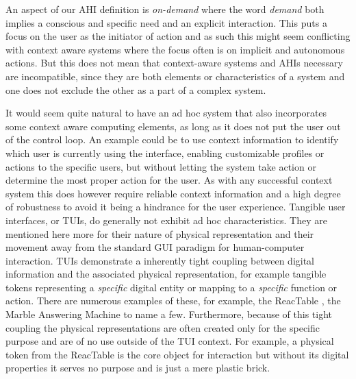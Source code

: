 An aspect of our AHI definition is \emph{on-demand} where the word \emph{demand} both implies a conscious and specific need and an explicit interaction.
This puts a focus on the user as the initiator of action and as such this might seem conflicting with context aware systems where the focus often is on implicit and autonomous actions.
But this does not mean that context-aware systems and AHIs necessary are incompatible, since they are both elements or characteristics of a system and one does not exclude the other as a part of a complex system.

It would seem quite natural to have an ad hoc system that also incorporates some context aware computing elements, as long as it does not put the user out of the control loop.
An example could be to use context information to identify which user is currently using the interface, enabling customizable profiles or actions to the specific users, but without letting the system take action or determine the most proper action for the user.
As with any successful context system this does however require reliable context information and a high degree of robustness to avoid it being a hindrance for the user experience.
\blank
Tangible user interfaces, or TUIs, do generally not exhibit ad hoc characteristics. 
They are mentioned here more for their nature of physical representation and their movement away from the standard GUI paradigm for human-computer interaction.
TUIs demonstrate a inherently tight coupling between digital information and the associated physical representation, for example tangible tokens representing a \emph{specific} digital entity or mapping to a \emph{specific} function or action.
There are numerous examples of these, for example, the ReacTable \cite{jorda2007reactable}, the Marble Answering Machine  to name a few.
Furthermore, because of this tight coupling the physical representations are often created only for the specific purpose and are of no use outside of the TUI context. 
For example, a physical token from the ReacTable is the core object for interaction but without its digital properties it serves no purpose and is just a mere plastic brick.

